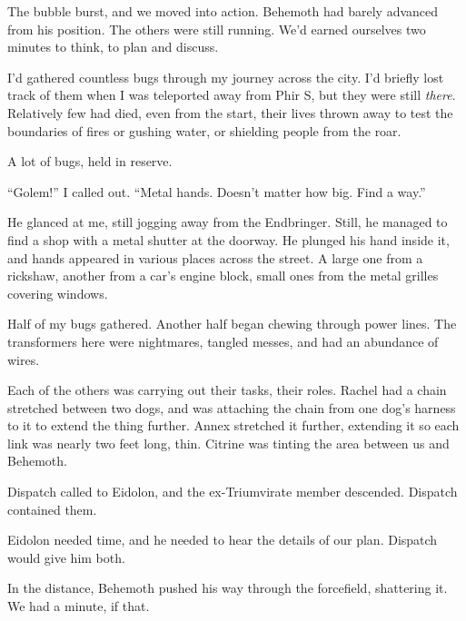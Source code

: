 The bubble burst, and we moved into action.  Behemoth had barely advanced from his position.  The others were still running.  We'd earned ourselves two minutes to think, to plan and discuss.



I'd gathered countless bugs through my journey across the city.  I'd briefly lost track of them when I was teleported away from Phir S, but they were still \emph{there}.  Relatively few had died, even from the start, their lives thrown away to test the boundaries of fires or gushing water, or shielding people from the roar.



A lot of bugs, held in reserve.



``Golem!''  I called out.  ``Metal hands.  Doesn't matter how big.  Find a way.''



He glanced at me, still jogging away from the Endbringer.  Still, he managed to find a shop with a metal shutter at the doorway.  He plunged his hand inside it, and hands appeared in various places across the street.  A large one from a rickshaw, another from a car's engine block, small ones from the metal grilles covering windows.



Half of my bugs gathered.  Another half began chewing through power lines.  The transformers here were nightmares, tangled messes, and had an abundance of wires.



Each of the others was carrying out their tasks, their roles.  Rachel had a chain stretched between two dogs, and was attaching the chain from one dog's harness to it to extend the thing further.  Annex stretched it further, extending it so each link was nearly two feet long, thin.  Citrine was tinting the area between us and Behemoth.



Dispatch called to Eidolon, and the ex-Triumvirate member descended.  Dispatch contained them.



Eidolon needed time, and he needed to hear the details of our plan.  Dispatch would give him both.



In the distance, Behemoth pushed his way through the forcefield, shattering it.  We had a minute, if that.



